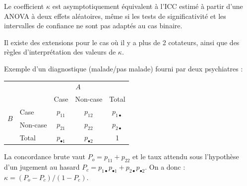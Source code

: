 \foilhead{}
Le coefficient $\kappa$ est asymptotiquement équivalent à l'ICC estimé à partir
d'une ANOVA à deux effets aléatoires, même si les tests de significativité et
les intervalles de confiance ne sont pas adaptés au cas binaire. 

Il existe des extensions pour le cas où il y a plus de 2
cotateurs\autocite{siegel88}, ainsi que des règles d'interprétation des valeurs
de $\kappa$\autocite{fleiss81b}.


Exemple d'un diagnostique (malade/pas malade) fourni par deux
psychiatres\autocite{dunn00} :
\begin{center}
\small
\begin{tabular}{l|l|cc|c|}
\multicolumn{2}{c}{}& \multicolumn{2}{c}{$A$} & \multicolumn{1}{c}{}\\
\cline{3-5}
\multicolumn{2}{c|}{}& Case & Non-case & Total\\
\cline{2-5}
\multirow{2}{*}{$B$} & Case & $p_{11}$ & $p_{12}$ & $p_{1\bullet}$\\
& Non-case & $p_{21}$ & $p_{22}$ & $p_{2\bullet}$\\
\cline{2-5}
& Total & $p_{\bullet 1}$ & $p_{\bullet 2}$ & 1\\
\cline{2-5}
\end{tabular}
\end{center}
\medskip

La concordance brute vaut $P_o=p_{11}+p_{22}$ et le taux attendu sous
l'hypothèse d'un jugement au hasard $P_c=p_{1\bullet}p_{\bullet
  1}+p_{2\bullet}p_{\bullet 2}$. \newline
On a donc : $\kappa=(P_o-P_c) / (1-P_c)$.




